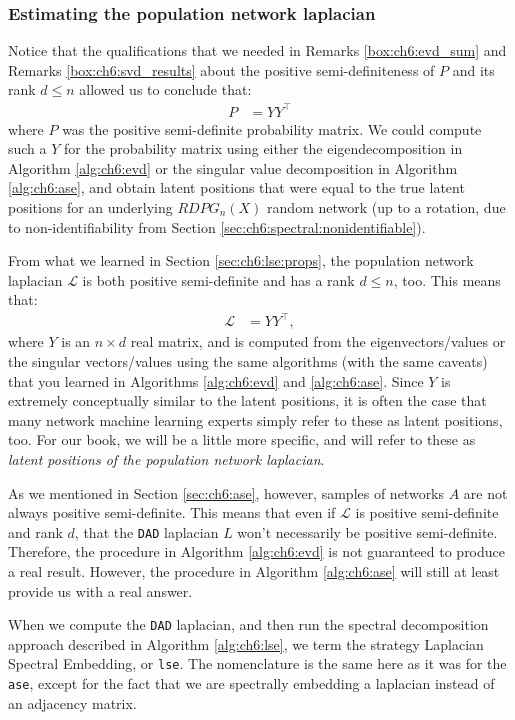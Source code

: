 \subsubsection{Estimating the population network laplacian}

Notice that the qualifications that we needed in Remarks \ref{box:ch6:evd_sum} and Remarks \ref{box:ch6:svd_results} about the positive semi-definiteness of $P$ and its rank $d \leq n$ allowed us to conclude that:
\begin{align*}
    P &= YY^\top
\end{align*}
where $P$ was the positive semi-definite probability matrix. We could compute such a $Y$ for the probability matrix using either the eigendecomposition in Algorithm \ref{alg:ch6:evd} or the singular value decomposition in Algorithm \ref{alg:ch6:ase}, and obtain latent positions that were equal to the true latent positions for an underlying $RDPG_n(X)$ random network (up to a rotation, due to non-identifiability from Section \ref{sec:ch6:spectral:nonidentifiable}).

From what we learned in Section \ref{sec:ch6:lse:props}, the population network laplacian $\mathcal L$ is both positive semi-definite and has a rank $d \leq n$, too. This means that:
\begin{align*}
    \mathcal L &= YY^\top,
\end{align*}
where $Y$ is an $n \times d$ real matrix, and is computed from the eigenvectors/values or the singular vectors/values using the same algorithms (with the same caveats) that you learned in Algorithms \ref{alg:ch6:evd} and \ref{alg:ch6:ase}. Since $Y$ is extremely conceptually similar to the latent positions, it is often the case that many network machine learning experts simply refer to these as latent positions, too. For our book, we will be a little more specific, and will refer to these as \textit{latent positions of the population network laplacian}.

As we mentioned in Section \ref{sec:ch6:ase}, however, samples of networks $A$ are not always positive semi-definite. This means that even if $\mathcal L$ is positive semi-definite and rank $d$, that the \texttt{DAD} laplacian $L$ won't necessarily be positive semi-definite. Therefore, the procedure in Algorithm \ref{alg:ch6:evd} is not guaranteed to produce a real result. However, the procedure in Algorithm \ref{alg:ch6:ase} will still at least provide us with a real answer. 

When we compute the \texttt{DAD} laplacian, and then run the spectral decomposition approach described in Algorithm \ref{alg:ch6:lse}, we term the strategy Laplacian Spectral Embedding, or \texttt{lse}. The nomenclature is the same here as it was for the \texttt{ase}, except for the fact that we are spectrally embedding a laplacian instead of an adjacency matrix.

